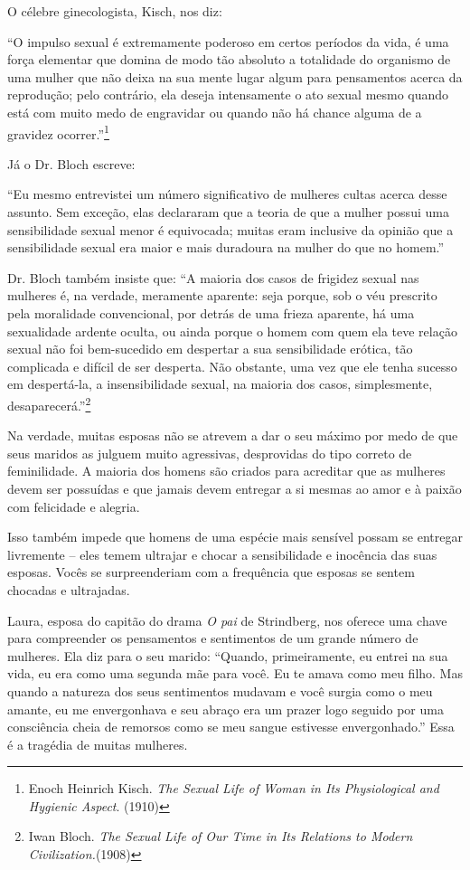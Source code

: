O célebre ginecologista, Kisch, nos diz:

``O impulso sexual é extremamente poderoso em certos períodos da vida, é
uma força elementar que domina de modo tão absoluto a totalidade do
organismo de uma mulher que não deixa na sua mente lugar algum para
pensamentos acerca da reprodução; pelo contrário, ela deseja
intensamente o ato sexual mesmo quando está com muito medo de engravidar
ou quando não há chance alguma de a gravidez ocorrer.''\footnote{Enoch
  Heinrich Kisch. \emph{The Sexual Life of Woman in Its Physiological
  and Hygienic Aspect}. (1910)}

Já o Dr. Bloch escreve:

``Eu mesmo entrevistei um número significativo de mulheres cultas acerca
desse assunto. Sem exceção, elas declararam que a teoria de que a mulher
possui uma sensibilidade sexual menor é equivocada; muitas eram
inclusive da opinião que a sensibilidade sexual era maior e mais
duradoura na mulher do que no homem.''

Dr. Bloch também insiste que: ``A maioria dos casos de frigidez sexual
nas mulheres é, na verdade, meramente aparente: seja porque, sob o véu
prescrito pela moralidade convencional, por detrás de uma frieza
aparente, há uma sexualidade ardente oculta, ou ainda porque o homem com
quem ela teve relação sexual não foi bem-sucedido em despertar a sua
sensibilidade erótica, tão complicada e difícil de ser desperta. Não
obstante, uma vez que ele tenha sucesso em despertá-la, a
insensibilidade sexual, na maioria dos casos, simplesmente,
desaparecerá.''\footnote{Iwan Bloch. \emph{The Sexual Life of Our Time
  in Its Relations to Modern Civilization.}(1908)}

Na verdade, muitas esposas não se atrevem a dar o seu máximo por medo de
que seus maridos as julguem muito agressivas, desprovidas do tipo
correto de feminilidade. A maioria dos homens são criados para acreditar
que as mulheres devem ser possuídas e que jamais devem entregar a si
mesmas ao amor e à paixão com felicidade e alegria.

Isso também impede que homens de uma espécie mais sensível possam se
entregar livremente -- eles temem ultrajar e chocar a sensibilidade e
inocência das suas esposas. Vocês se surpreenderiam com a frequência que
esposas se sentem chocadas e ultrajadas.

Laura, esposa do capitão do drama \emph{O pai} de Strindberg, nos
oferece uma chave para compreender os pensamentos e sentimentos de um
grande número de mulheres. Ela diz para o seu marido: ``Quando,
primeiramente, eu entrei na sua vida, eu era como uma segunda mãe para
você. Eu te amava como meu filho. Mas quando a natureza dos seus
sentimentos mudavam e você surgia como o meu amante, eu me envergonhava
e seu abraço era um prazer logo seguido por uma consciência cheia de
remorsos como se meu sangue estivesse envergonhado.'' Essa é a tragédia
de muitas mulheres.

